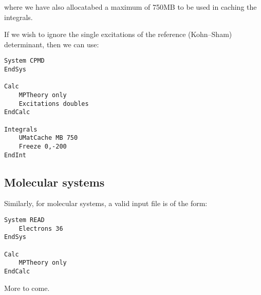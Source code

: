 \documentclass[openany,a4paper,10pt,english]{manual}
\begin{document}
where we have also allocatabed a maximum of 750MB to be used in caching the integrals.

If we wish to ignore the single excitations of the reference (Kohn--Sham) determinant, then we can use:

\begin{Verbatim}[commandchars=@\[\]]
System CPMD
EndSys

Calc
    MPTheory only
    Excitations doubles
EndCalc

Integrals
    UMatCache MB 750
    Freeze 0,-200
EndInt
\end{Verbatim}


\subsection{Molecular systems}

Similarly, for molecular systems, a valid input file is of the form:

\begin{Verbatim}[commandchars=@\[\]]
System READ
    Electrons 36
EndSys

Calc
    MPTheory only
EndCalc
\end{Verbatim}

More to come.
\end{document}
